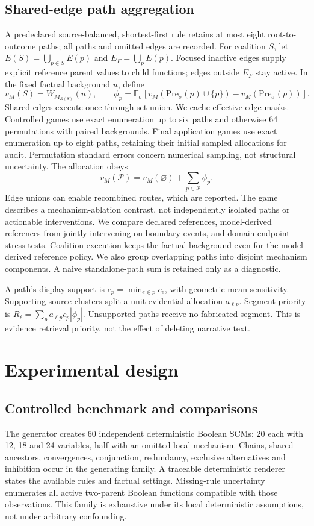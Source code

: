 \documentclass{svproc}
\begin{document}
\subsection{Shared-edge path aggregation}
A predeclared source-balanced, shortest-first rule retains at most eight root-to-outcome paths; all paths and omitted edges are recorded. For coalition $S$, let $E(S)=\bigcup_{p\in S}E(p)$ and $E_F=\bigcup_pE(p)$. Focused inactive edges supply explicit reference parent values to child functions; edges outside $E_F$ stay active. In the fixed factual background $u$, define
\begin{equation}
v_M(S)=W_{M_{E(S)}}(u),\qquad
\phi_p=\mathbb E_{\sigma}[v_M(\mathrm{Pre}_\sigma(p)\cup\{p\})-v_M(\mathrm{Pre}_\sigma(p))].
\end{equation}
Shared edges execute once through set union. We cache effective edge masks. Controlled games use exact enumeration up to six paths and otherwise 64 permutations with paired backgrounds. Final application games use exact enumeration up to eight paths, retaining their initial sampled allocations for audit. Permutation standard errors concern numerical sampling, not structural uncertainty. The allocation obeys
\begin{equation}
v_M(\mathcal P)=v_M(\varnothing)+\sum_{p\in\mathcal P}\phi_p.
\end{equation}
Edge unions can enable recombined routes, which are reported. The game describes a mechanism-ablation contrast, not independently isolated paths or actionable interventions. We compare declared references, model-derived references from jointly intervening on boundary events, and domain-endpoint stress tests. Coalition execution keeps the factual background even for the model-derived reference policy. We also group overlapping paths into disjoint mechanism components. A naive standalone-path sum is retained only as a diagnostic.

A path's display support is $c_p=\min_{e\in p}c_e$, with geometric-mean sensitivity. Supporting source clusters split a unit evidential allocation $a_{\ell p}$. Segment priority is $R_\ell=\sum_pa_{\ell p}c_p|\phi_p|$. Unsupported paths receive no fabricated segment. This is evidence retrieval priority, not the effect of deleting narrative text.

\section{Experimental design}
\subsection{Controlled benchmark and comparisons}
The generator creates 60 independent deterministic Boolean SCMs: 20 each with 12, 18 and 24 variables, half with an omitted local mechanism. Chains, shared ancestors, convergences, conjunction, redundancy, exclusive alternatives and inhibition occur in the generating family. A traceable deterministic renderer states the available rules and factual settings. Missing-rule uncertainty enumerates all active two-parent Boolean functions compatible with those observations. This family is exhaustive under its local deterministic assumptions, not under arbitrary confounding.
\end{document}
